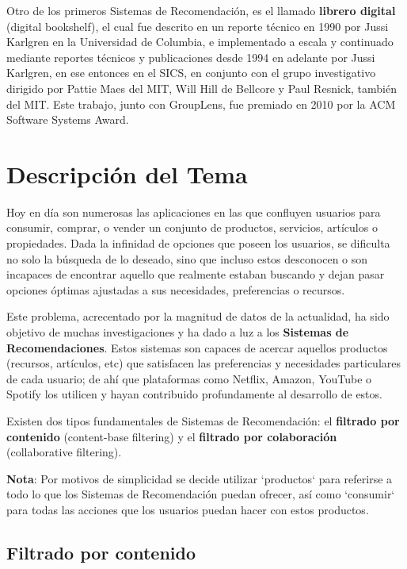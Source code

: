 \documentclass[14pt]{extarticle}
\begin{document}
Otro de los primeros Sistemas de Recomendación, es el llamado \textbf{librero digital} (digital bookshelf), el cual fue descrito en un reporte técnico en 1990 por Jussi Karlgren en la Universidad de Columbia, e implementado a escala y continuado mediante reportes técnicos y publicaciones desde 1994 en adelante por Jussi Karlgren, en ese entonces en el SICS, en conjunto con el grupo investigativo dirigido por Pattie Maes del MIT, Will Hill de Bellcore y Paul Resnick, también del MIT. Este trabajo, junto con GroupLens, fue premiado en 2010 por la ACM Software Systems Award.

\section{Descripción del Tema}

Hoy en día son numerosas las aplicaciones en las que confluyen usuarios para consumir, comprar, o vender un conjunto de productos, servicios, artículos o propiedades. Dada la infinidad de opciones que poseen los usuarios, se dificulta no solo la búsqueda de lo deseado, sino que incluso estos desconocen o son incapaces de encontrar aquello que realmente estaban buscando y dejan pasar opciones óptimas ajustadas a sus necesidades, preferencias o recursos.

Este problema, acrecentado por la magnitud de datos de la actualidad, ha sido objetivo de muchas investigaciones y ha dado a luz a los \textbf{Sistemas de Recomendaciones}. Estos sistemas son capaces de acercar aquellos productos (recursos, artículos, etc) que satisfacen las preferencias y necesidades particulares de cada usuario; de ahí que plataformas como Netflix, Amazon, YouTube o Spotify los utilicen y hayan contribuido profundamente al desarrollo de estos.

Existen dos tipos fundamentales de Sistemas de Recomendación: el \textbf{filtrado por contenido} (content-base filtering) y el \textbf{filtrado por colaboración} (collaborative filtering).

\textbf{Nota}: Por motivos de simplicidad se decide utilizar `productos` para referirse a todo lo que los Sistemas de Recomendación puedan ofrecer, así como `consumir` para todas las acciones que los usuarios puedan hacer con estos productos.

\subsection{Filtrado por contenido}
\end{document}
